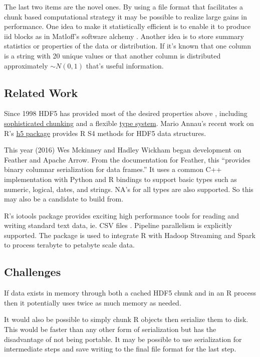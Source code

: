 \documentclass[12pt]{article}
\begin{document}
The last two items are the novel ones. By using a file format
that facilitates a chunk based computational strategy it may be possible to
realize large gains in performance. One idea to make it statistically
efficient is to enable it to produce iid blocks as in Matloff's software
alchemy \cite{matloff2014software}. Another idea is to store summary
statistics or properties of the data or distribution. If it's known that
one column is a string with 20 unique values or that another column is
distributed approximately $\sim N(0, 1)$ that's useful information. 

\subsection{Related Work}

Since 1998 HDF5 has provided most of the desired properties above
\cite{hdf5}, including
\href{https://support.hdfgroup.org/HDF5/doc/Advanced/Chunking/}{sophisticated
chunking} and a flexible
\href{https://support.hdfgroup.org/HDF5/doc1.6/UG/11_Datatypes.html}{type system}.
Mario Annau's recent work on R's \href{https://github.com/mannau/h5}{h5
package} provides R S4 methods for HDF5 data structures.

This year (2016) Wes Mckinney and Hadley Wickham began development on Feather and
Apache Arrow. From the documentation for Feather, this ``provides binary columnar
serialization for data frames.'' It uses a common C++ implementation with
Python and R bindings to support basic types such as numeric, logical,
dates, and strings. NA's for all types are also supported. So this may also
be a candidate to build from.

R's iotools package provides exciting high performance tools for reading
and writing standard text data, ie. CSV files \cite{arnold2015iotools}.
Pipeline parallelism is explicitly supported. The package is used to
integrate R with Hadoop Streaming and Spark to process terabyte to petabyte
scale data.

\subsection{Challenges}

If data exists in memory through both a cached HDF5 chunk and in an R process
then it potentially uses twice as much memory as needed.

It would also be possible to simply chunk R objects then serialize 
them to disk. This would be faster than any other form of serialization but
has the disadvantage of not being portable. It may be possible to use 
serialization for intermediate steps and save writing to the final file
format for the last step.
\end{document}
